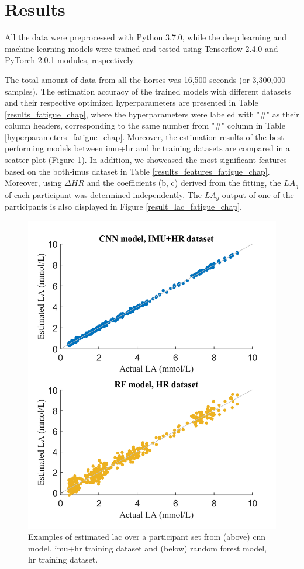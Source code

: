 \section{Results}
\label{sec:results}

All the data were preprocessed with Python 3.7.0, while the deep learning and machine learning models were trained and tested using Tensorflow 2.4.0 and PyTorch 2.0.1 modules, respectively. 

The total amount of data from all the horses was 16,500 seconds (or 3,300,000 samples). The estimation accuracy of the trained models with different datasets and their respective optimized hyperparameters are presented in Table \ref{results_fatigue_chap}, where the hyperparameters were labeled with "\#" as their column headers, corresponding to the same number from "\#" column in Table \ref{hyperparameters_fatigue_chap}. Moreover, the estimation results of the best performing models between \gls{imu}+\gls{hr} and \gls{hr} training datasets are compared in a scatter plot (Figure \ref{result_fig_fatigue_chap}). In addition, we showcased the most significant features based on the both-\gls{imu}s dataset in Table \ref{results_features_fatigue_chap}. Moreover, using $\Delta HR$ and the coefficients (b, c) derived from the fitting, the $LA_g$ of each participant was determined independently. The $LA_g$ output of one of the participants is also displayed in Figure \ref{result_lac_fatigue_chap}.



\begin{figure}[htb]
\centering
\includegraphics[width=.65\linewidth]{chapters/fatigue/figures/Picture5.png}
\caption{Examples of estimated \gls{lac} over a participant \gls{set} from (above) \gls{cnn} model, \gls{imu}+\gls{hr} training dataset and (below) random forest model, \gls{hr} training dataset.}
\label{result_fig_fatigue_chap}
\end{figure}

